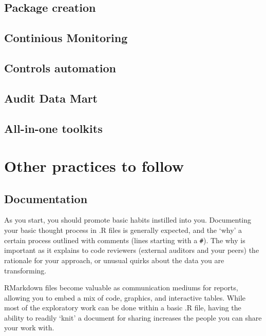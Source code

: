 \documentclass[
]{book}
\begin{document}
\hypertarget{package-creation}{%
\section{Package creation}\label{package-creation}}

\hypertarget{continious-monitoring}{%
\section{Continious Monitoring}\label{continious-monitoring}}

\hypertarget{controls-automation}{%
\section{Controls automation}\label{controls-automation}}

\hypertarget{audit-data-mart}{%
\section{Audit Data Mart}\label{audit-data-mart}}

\hypertarget{all-in-one-toolkits}{%
\section{All-in-one toolkits}\label{all-in-one-toolkits}}

\hypertarget{other-practices-to-follow}{%
\chapter{Other practices to follow}\label{other-practices-to-follow}}

\hypertarget{documentation}{%
\section{Documentation}\label{documentation}}

As you start, you should promote basic habits instilled into you. Documenting your basic thought process in .R files is generally expected, and the `why' a certain process outlined with comments (lines starting with a \texttt{\#}). The why is important as it explains to code reviewers (external auditors and your peers) the rationale for your approach, or unusual quirks about the data you are transforming.

RMarkdown files become valuable as communication mediums for reports, allowing you to embed a mix of code, graphics, and interactive tables. While most of the exploratory work can be done within a basic .R file, having the ability to readily `knit' a document for sharing increases the people you can share your work with.
\end{document}
